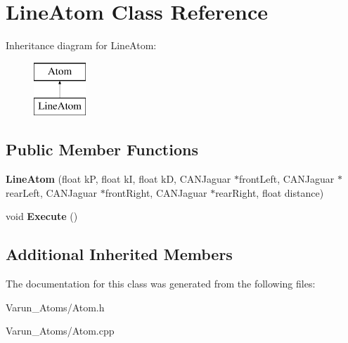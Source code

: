 \hypertarget{class_line_atom}{\section{Line\-Atom Class Reference}
\label{class_line_atom}
}
Inheritance diagram for Line\-Atom\-:\begin{figure}[H]
\begin{center}
\leavevmode
\includegraphics[height=2.000000cm]{class_line_atom}
\end{center}
\end{figure}
\subsection*{Public Member Functions}
\begin{DoxyCompactItemize}
\item 
\hypertarget{class_line_atom_abdf3de986b0d455cac39497e323898dc}{{\bfseries Line\-Atom} (float k\-P, float k\-I, float k\-D, C\-A\-N\-Jaguar $\ast$front\-Left, C\-A\-N\-Jaguar $\ast$rear\-Left, C\-A\-N\-Jaguar $\ast$front\-Right, C\-A\-N\-Jaguar $\ast$rear\-Right, float distance)}\label{class_line_atom_abdf3de986b0d455cac39497e323898dc}

\item 
\hypertarget{class_line_atom_a576d473b8fdd59aba7117529a69e37d0}{void {\bfseries Execute} ()}\label{class_line_atom_a576d473b8fdd59aba7117529a69e37d0}

\end{DoxyCompactItemize}
\subsection*{Additional Inherited Members}


The documentation for this class was generated from the following files\-:\begin{DoxyCompactItemize}
\item 
Varun\-\_\-\-Atoms/Atom.\-h\item 
Varun\-\_\-\-Atoms/Atom.\-cpp\end{DoxyCompactItemize}
